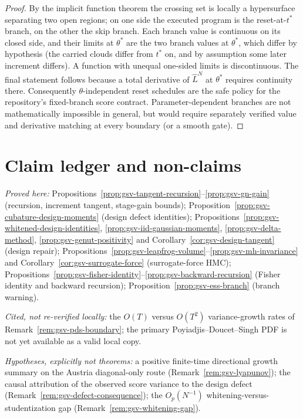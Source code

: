 \documentclass[11pt]{article}
\theoremstyle{definition}
\theoremstyle{remark}
\begin{document}
\begin{proof}
By the implicit function theorem the crossing set is locally a hypersurface
separating two open regions; on one side the executed program is the
reset-at-$t^{*}$ branch, on the other the skip branch.  Each branch value is
continuous on its closed side, and their limits at $\theta^{*}$ are the two
branch values at $\theta^{*}$, which differ by hypothesis (the carried
clouds differ from $t^{*}$ on, and by assumption some later increment
differs).  A function with unequal one-sided limits is discontinuous.  The
final statement follows because a total derivative of $\widehat L^{N}$ at
$\theta^{*}$ requires continuity there.  Consequently $\theta$-independent
reset schedules are the safe policy for the repository's fixed-branch score
contract.  Parameter-dependent branches are not mathematically impossible in
general, but would require separately verified value and derivative matching at
every boundary (or a smooth gate).
\end{proof}

\section{Claim ledger and non-claims}
\label{sec:gsv-claims}

\emph{Proved here:}
Propositions~\ref{prop:gsv-tangent-recursion}--\ref{prop:gsv-gn-gain}
(recursion, increment tangent, stage-gain bounds);
Proposition~\ref{prop:gsv-cubature-design-moments} (design defect
identities); Propositions~\ref{prop:gsv-whitened-design-identities},
\ref{prop:gsv-iid-gaussian-moments}, \ref{prop:gsv-delta-method},
\ref{prop:gsv-genut-positivity} and
Corollary~\ref{cor:gsv-design-tangent} (design repair);
Propositions~\ref{prop:gsv-leapfrog-volume}--\ref{prop:gsv-mh-invariance}
and Corollary~\ref{cor:gsv-surrogate-force} (surrogate-force HMC);
Propositions~\ref{prop:gsv-fisher-identity}--\ref{prop:gsv-backward-recursion}
(Fisher identity and backward recursion);
Proposition~\ref{prop:gsv-ess-branch} (branch warning).

\emph{Cited, not re-verified locally:} the $O(T)$ versus $O(T^{2})$
variance-growth rates of Remark~\ref{rem:gsv-pds-boundary}; the primary
Poyiadjis--Doucet--Singh PDF is not yet available as a valid local copy.

\emph{Hypotheses, explicitly not theorems:} a positive finite-time directional
growth summary on the Austria diagonal-only route
(Remark~\ref{rem:gsv-lyapunov}); the causal attribution of the observed
score variance to the design defect
(Remark~\ref{rem:gsv-defect-consequence}); the $O_p(N^{-1})$
whitening-versus-studentization gap (Remark~\ref{rem:gsv-whitening-gap}).
\end{document}
